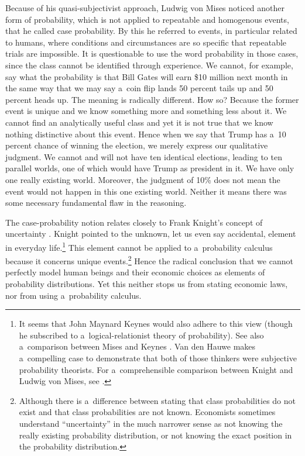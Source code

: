 Because of his quasi-subjectivist approach, Ludwig von Mises noticed another form of probability, which is not applied to repeatable and homogenous events, that he called case probability. By this he referred to events, in particular related to humans, where conditions and circumstances are so specific that repeatable trials are impossible. It is questionable to use the word probability in those cases, since the class cannot be identified through experience. We cannot, for example, say what the probability is that Bill Gates will earn \$10 million next month in the same way that we may say a~coin flip lands 50 percent tails up and 50 percent heads up. The meaning is radically different. How so? Because the former event is unique and we know something more and something less about it. We cannot find an analytically useful class and yet it is not true that we know nothing distinctive about this event. Hence when we say that Trump has a~10 percent chance of winning the election, we merely express our qualitative judgment. We cannot and will not have ten identical elections, leading to ten parallel worlds, one of which would have Trump as president in it. We have only one really existing world. Moreover, the judgment of 10\% does not mean the event would not happen in this one existing world. Neither it means there was some necessary fundamental flaw in the reasoning.



The case-probability notion relates closely to Frank Knight's concept of uncertainty 
\parencite[][pp.226–232]{knight_risk_1971}. %
 Knight pointed to the unknown, let us even say accidental, element in everyday life.\footnote{It seems that John Maynard Keynes 
\parencite*[][]{keynes_treatise_1921} %
 would also adhere to this view (though he subscribed to a~logical-relationist theory of probability). See also a~comparison between Mises and Keynes 
\parencite[][]{hauwe_john_2007}. %
 Van den Hauwe makes a~compelling case to demonstrate that both of those thinkers were subjective probability theorists. For a~comprehensible comparison between Knight and Ludwig von Mises, see 
\parencite[][]{hoppe_limits_2007}.%
} This element cannot be applied to a~probability calculus because it concerns unique events.\footnote{Although there is a~difference between stating that class probabilities do not exist and that class probabilities are not known. Economists sometimes understand ``uncertainty'' in the much narrower sense as not knowing the really existing probability distribution, or not knowing the exact position in the probability distribution.} Hence the radical conclusion that we cannot perfectly model human beings and their economic choices as elements of probability distributions. Yet this neither stops us from stating economic laws, nor from using a~probability calculus.




